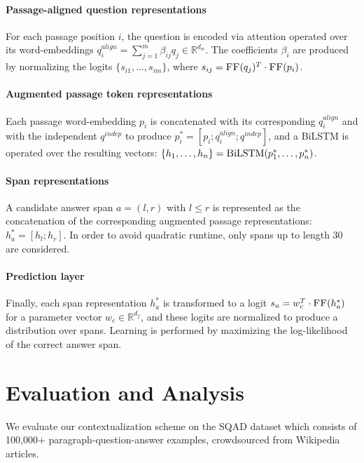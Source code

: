 \documentclass[11pt,a4paper]{article}
\newcommand{\squad}{\textsc{SQ\normalfont{u}AD}}
\begin{document}
\paragraph{Passage-aligned question representations}
For each passage position $i$, the question is encoded via attention operated over its word-embeddings $q_{i}^{align}=\sum_{j=1}^{m}\beta_{ij} q_j\in\mathbb{R}^{d_w}$.
The coefficients $\beta_i$ are produced by normalizing the logits $\{s_{i1},\dots,s_{im}\}$, where $s_{ij}=\textsc{FF}(q_j)^T \cdot \textsc{FF}(p_i)$.

\paragraph{Augmented passage token representations}
Each passage word-embedding $p_i$ is concatenated with its corresponding $q_i^{align}$ and with the independent $q^{indep}$ to produce $p_i^*=[p_i;q_i^{align};q^{indep}]$, and a BiLSTM is operated over the resulting vectors: $\{h_1,\dots,h_n\}=\textsc{B\normalfont{i}LSTM}(p_1^*,\dots,p_n^*)$.

\paragraph{Span representations} A candidate answer span $a=(l,r)$ with $l \leq r$ is represented as the concatenation of the corresponding augmented passage representations: $h_a^* = [h_l;h_r]$. In order to avoid quadratic runtime, only spans up to length 30 are considered.

\paragraph{Prediction layer}
Finally, each span representation $h_a^*$ is transformed to a logit $s_{a} = w_c^T \cdot \textsc{FF}(h_a^*)$ for a parameter vector $w_c\in\mathbb{R}^{d_f}$, and these logits are normalized to produce a distribution over spans. Learning is performed by maximizing the log-likelihood of the correct answer span.
 
\section{Evaluation and Analysis}
\label{sec:evaluation_and_analysis}

We evaluate our contextualization scheme on the \squad{} dataset \cite{rajpurkar2016} which consists of 100,000+  paragraph-question-answer examples, crowdsourced from Wikipedia articles.
\end{document}
